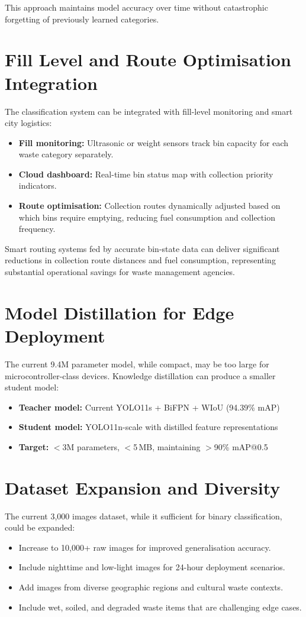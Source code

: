 This approach maintains model accuracy over time without catastrophic forgetting of previously learned categories.

\section{Fill Level and Route Optimisation Integration}

The classification system can be integrated with fill-level monitoring and smart city logistics:
\begin{itemize}
    \item \textbf{Fill monitoring:} Ultrasonic or weight sensors track bin capacity for each waste category separately.
    \item \textbf{Cloud dashboard:} Real-time bin status map with collection priority indicators.
    \item \textbf{Route optimisation:} Collection routes dynamically adjusted based on which bins require emptying, reducing fuel consumption and collection frequency.
\end{itemize}

Smart routing systems fed by accurate bin-state data can deliver significant reductions in collection route distances and fuel consumption, representing substantial operational savings for waste management agencies.

\section{Model Distillation for Edge Deployment}

The current 9.4M parameter model, while compact, may be too large for microcontroller-class devices. Knowledge distillation can produce a smaller student model:
\begin{itemize}
    \item \textbf{Teacher model:} Current YOLO11s + BiFPN + WIoU (94.39\% mAP)
    \item \textbf{Student model:} YOLO11n-scale with distilled feature representations
    \item \textbf{Target:} $<$3M parameters, $<$5\,MB, maintaining $>$90\% mAP@0.5
\end{itemize}

\section{Dataset Expansion and Diversity}

The current 3,000 images dataset, while it sufficient for binary classification, could be expanded:
\begin{itemize}
    \item Increase to 10,000+ raw images for improved generalisation accuracy.
    \item Include nighttime and low-light images for 24-hour deployment scenarios.
    \item Add images from diverse geographic regions and cultural waste contexts.
    \item Include wet, soiled, and degraded waste items that are challenging edge cases.
\end{itemize}

